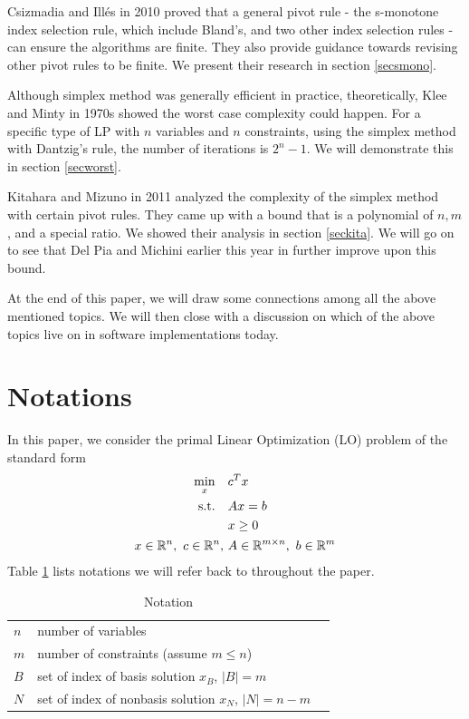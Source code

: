 \documentclass[11pt]{article}
\begin{document}
Csizmadia and Illés in 2010 \cite{csizmadia2012s} proved that a general pivot rule - the s-monotone index selection rule, which include Bland's, and two other index selection rules - can ensure the algorithms are finite. They also provide guidance towards revising other pivot rules to be finite. We present their research in section \ref{secsmono}. 

Although simplex method was generally efficient in practice, theoretically, Klee and Minty \cite{wikipediacontributors_2020_kleeminty} in 1970s showed the worst case complexity could happen. For a specific type of LP with $n$ variables and $n$ constraints, using the simplex method with Dantzig's rule, the number of iterations is $2^n-1$. We will demonstrate this in section \ref{secworst}.

Kitahara and Mizuno in 2011 \cite{kitahara2013bound} analyzed the complexity of the simplex method with certain pivot rules. They came up with a bound that is a polynomial of $n, m$, and a special ratio. We showed their analysis in section \ref{seckita}. We will go on to see that Del Pia and Michini earlier this year in \cite{pia} further improve upon this bound.

At the end of this paper, we will draw some connections among all the above mentioned topics. We will then close with a discussion on which of the above topics live on in software implementations today.

\section{Notations}
In this paper, we consider the primal Linear Optimization (LO) problem of the standard form
\begin{align}
\begin{split}
\min_x \quad &c^Tx\\
\text{s.t.} \quad &Ax = b\\
&x \ge 0\\
 x \in \mathbb{R}^n,\ c \in \mathbb{R}^n,\ &A \in \mathbb{R}^{m\times n},\ b \in \mathbb{R}^m   
\end{split} \label{LOprimal}
\end{align}
Table \ref{tbnotation} lists notations we will refer back to throughout the paper.
\begin{table}[h]
\caption{Notation}
\label{tbnotation}
\centering
\begin{tabular}{lll}
\hline
$n$ & number of variables   &  \\
$m$ & number of constraints (assume $m \le n$) &  \\
$B$ & set of index of basis solution $x_B$, $|B| = m$&  \\
$N$ & set of index of nonbasis solution $x_N$, $|N| = n-m$&  \\
\hline
\end{tabular}
\end{table}
\end{document}
